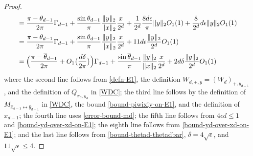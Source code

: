\documentclass[11pt]{article}
\newcommand{\eps}{\epsilon}
\newcommand{\thetabar}{\overline{\theta}}
\newcommand{\Wnpy}[1]{W_{#1, +, y}}
\begin{document}
\begin{proof}
\begin{align}
&= \frac{\pi-\theta_{d-1}}{2\pi} \Gamma_{d-1}  +  \frac{\sin \theta_{d-1}}{\pi} \frac{\|y\|_2}{\|x\|_2} \frac{x}{2^d} + \frac{1}{2^d} \frac{8 d \eps}{ \pi} \|y\|_2 O_1(1) + \frac{8}{2^d} d \eps \|y\|_2 O_1(1)\notag \\
&= \frac{\pi-\theta_{d-1}}{2\pi} \Gamma_{d-1}  +  \frac{\sin \theta_{d-1}}{\pi} \frac{\|y\|_2}{\|x\|_2} \frac{x}{2^d} + 11 d \eps \frac{\|y\|_2}{2^d} O_1(1) \notag\\
&= \Bigl( \frac{\pi-\thetabar_{d-1}}{2\pi} +O_1 \bigl(\frac{d \delta}{2 \pi} \bigr) \Bigr) \Gamma_{d-1}  +  \frac{\sin \thetabar_{d-1}}{\pi} \frac{\|y\|_2}{\|x\|_2} \frac{x}{2^d} + 2 d \delta \frac{\|y\|_2}{2^d} O_1(1)  \label{recurrence-relation-gammad}
\end{align}
where the second line follows from \eqref{defn-E1}, the definition $\Wnpy{d}= (W_d)_{+, y_{d-1}}$, and the definition of $Q_{x_d, y_d}$ in \eqref{WDC}; the third line follows by the definition of $M_{\hat{x}_{d-1} \leftrightarrow \hat{y}_{d-1} }$ in \eqref{WDC}, the bound \eqref{bound-piwixiy-on-E1}, and the definition of $x_{d-1}$; the fourth line uses \eqref{error-bound-md}; the fifth line follows from $4 \eps d \leq 1$ and \eqref{bound-yd-over-xd-on-E1}; the eighth line follows from \eqref{bound-yd-over-xd-on-E1}; and the last line follows from \eqref{bound-thetad-thetadbar}, $ \delta = 4 \sqrt{\eps}$, and $11 \sqrt{\eps} \leq 4$.


\end{proof}
\end{document}
